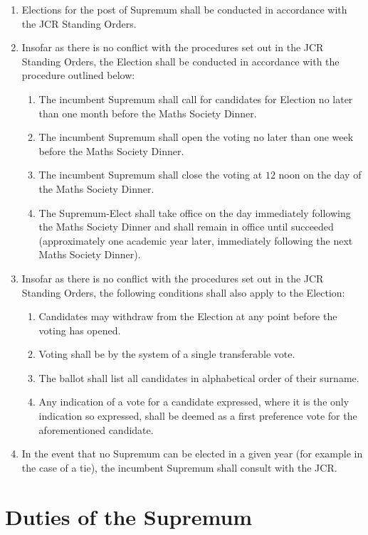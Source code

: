 \documentclass[pdftex,a4paper]{report}
\begin{document}
\begin{enumerate}[label=\Roman*)]
	\item Elections for the post of Supremum shall be conducted in accordance with the JCR Standing Orders.
	\item Insofar as there is no conflict with the procedures set out in the JCR Standing Orders, the Election shall be conducted in accordance with the procedure outlined below:
	\begin{enumerate}[label=\roman*)]
		\item The incumbent Supremum shall call for candidates for Election no later than one month before the Maths Society Dinner.
		\item The incumbent Supremum shall open the voting no later than one week before the Maths Society Dinner.
		\item The incumbent Supremum shall close the voting at $12$ noon on the day of the Maths Society Dinner.
		\item The Supremum-Elect shall take office on the day immediately following the Maths Society Dinner and shall remain in office until succeeded (approximately one academic year later, immediately following the next Maths Society Dinner).
	\end{enumerate}
	\item Insofar as there is no conflict with the procedures set out in the JCR Standing Orders, the following conditions shall also apply to the Election:
	\begin{enumerate}[label=\roman*)]
		\item Candidates may withdraw from the Election at any point before the voting has opened.
		\item Voting shall be by the system of a single transferable vote.
		\item The ballot shall list all candidates in alphabetical order of their surname.
		\item Any indication of a vote for a candidate expressed, where it is the only indication so expressed, shall be deemed as a first preference vote for the aforementioned candidate.
	\end{enumerate}
	\item In the event that no Supremum can be elected in a given year (for example in the case of a tie), the incumbent Supremum shall consult with the JCR.
\end{enumerate}


\section*{Duties of the Supremum}
\end{document}
